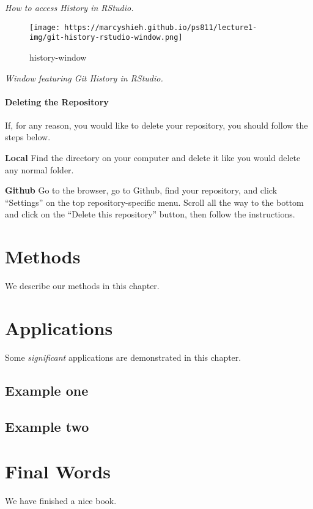 \documentclass[
]{book}
\begin{document}
\emph{How to access History in RStudio.}

\begin{figure}
\centering
\texttt{[image: https://marcyshieh.github.io/ps811/lecture1-img/git-history-rstudio-window.png]}
\caption{history-window}
\end{figure}

\emph{Window featuring Git History in RStudio.}

\hypertarget{deleting-the-repository}{%
\subsubsection{Deleting the Repository}\label{deleting-the-repository}}

If, for any reason, you would like to delete your repository, you should follow the steps below.

\textbf{Local} Find the directory on your computer and delete it like you would delete any normal folder.

\textbf{Github} Go to the browser, go to Github, find your repository, and click ``Settings'' on the top repository-specific menu. Scroll all the way to the bottom and click on the ``Delete this repository'' button, then follow the instructions.

\hypertarget{methods}{%
\chapter{Methods}\label{methods}}

We describe our methods in this chapter.

\hypertarget{applications}{%
\chapter{Applications}\label{applications}}

Some \emph{significant} applications are demonstrated in this chapter.

\hypertarget{example-one}{%
\section{Example one}\label{example-one}}

\hypertarget{example-two}{%
\section{Example two}\label{example-two}}

\hypertarget{final-words}{%
\chapter{Final Words}\label{final-words}}

We have finished a nice book.

  
\end{document}
